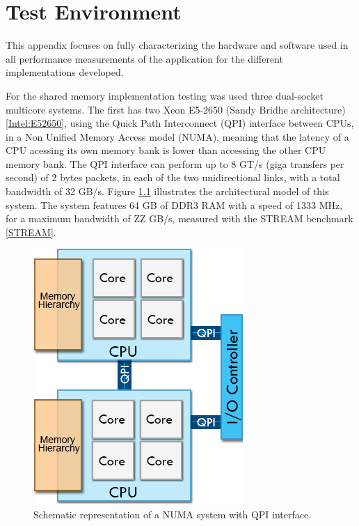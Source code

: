 \appendix
{}
\chapter{Test Environment}
\label{App:TestEnv}

This appendix focuses on fully characterizing the hardware and software used in all performance measurements of the application for the different implementations developed.

For the shared memory implementation testing was used three dual-socket multicore systems. The first has two \intel Xeon E5-2650 (Sandy Bridhe architecture) \ref{Intel:E52650}, using the Quick Path Interconnect (QPI) interface between CPUs, in a Non Unified Memory Access model (NUMA), meaning that the latency of a CPU acessing its own memory bank is lower than accessing the other CPU memory bank. The QPI interface can perform up to 8 GT/s (giga transfers per second) of 2 bytes packets, in each of the two unidirectional links, with a total bandwidth of 32 GB/s. Figure \ref{fig:SystemModel} illustrates the architectural model of this system. The system features 64 GB of DDR3 RAM with a speed of 1333 MHz, for a maximum bandwidth of ZZ GB/s, measured with the STREAM benchmark \ref{STREAM}.

\begin{figure}[!htp]
	\begin{center}
		\includegraphics[scale=0.5]{../../common/img/numa_qpi.png}
		\caption{Schematic representation of a NUMA system with QPI interface.}
		\label{fig:SystemModel}
	\end{center}
\end{figure}

